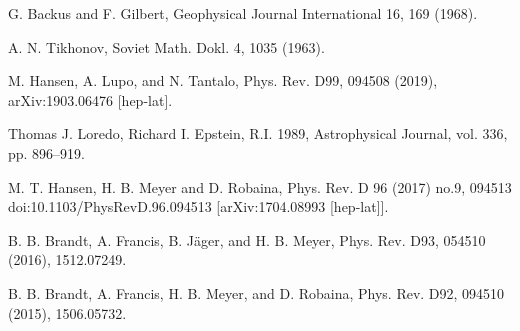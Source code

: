 \documentclass[a4paper,10pt]{article}
\begin{document}
\newpage
\begin{thebibliography}{9}
G. Backus and F. Gilbert, Geophysical Journal International 16, 169 (1968).

A. N. Tikhonov, Soviet Math. Dokl. 4, 1035 (1963).

M. Hansen, A. Lupo, and N. Tantalo, Phys. Rev. D99,
094508 (2019), arXiv:1903.06476 [hep-lat].

Thomas J. Loredo, Richard I. Epstein,
 R.I. 1989, Astrophysical Journal, vol. 336, pp. 896–919.

M. T. Hansen, H. B. Meyer and D. Robaina, Phys. Rev. D 96 (2017) no.9, 094513 doi:10.1103/PhysRevD.96.094513 [arXiv:1704.08993 [hep-lat]].

B. B. Brandt, A. Francis, B. J\"ager, and H. B. Meyer, Phys. Rev. D93, 054510 (2016), 1512.07249.


B. B. Brandt, A. Francis, H. B. Meyer, and D. Robaina, Phys. Rev. D92, 094510 (2015), 1506.05732.

\end{thebibliography}
\end{document}
